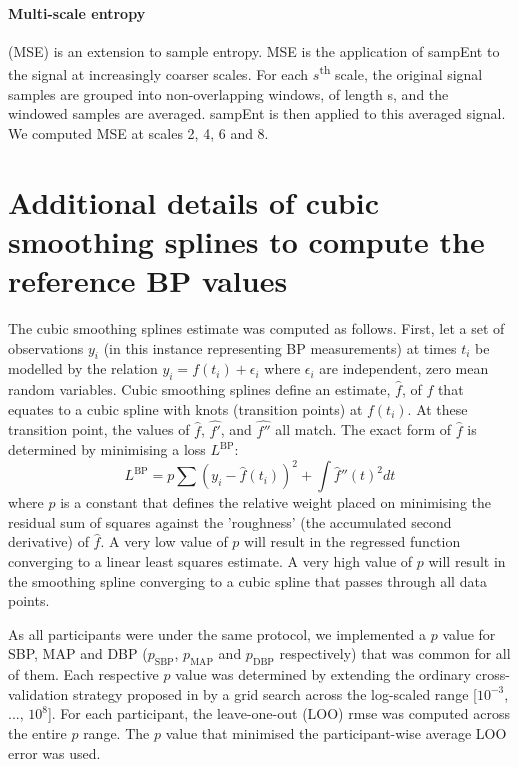 \documentclass[fleqn,10pt]{wlscirep}
\begin{document}
\paragraph{Multi-scale entropy} (MSE) is an extension to sample entropy. MSE is the application of sampEnt to the signal at increasingly coarser scales. For each $s$\textsuperscript{th} scale, the original signal samples are grouped into non-overlapping windows, of length s, and the windowed samples are averaged. sampEnt is then applied to this averaged signal. We computed MSE at scales 2, 4, 6 and 8.


\section{Additional details of cubic smoothing splines to compute the reference BP values}
\label{sec:splines_added_info}

The cubic smoothing splines estimate was computed as follows. First, let a set of observations $y_i$ (in this instance representing BP measurements) at times $t_i$ be modelled by the relation $y_i = f(t_i) + \epsilon_i$ where $\epsilon_i$ are independent, zero mean random variables. Cubic smoothing splines define an estimate, $\hat{f}$, of $f$ that equates to a cubic spline with knots (transition points) at $f(t_i)$. At these transition point, the values of $\hat{f}$, $\hat{f'}$, and $\hat{f''}$ all match. The exact form of $\hat{f}$ is determined by minimising a loss $L^{\text{BP}}$:
\begin{equation}
L^{\text{BP}} = p \sum (y_i - \hat{f}(t_i))^2 + \int \hat{f}''(t)^2 dt
\label{eqn:splines}
\end{equation}
where $p$ is a constant that defines the relative weight placed on minimising the residual sum of squares against the 'roughness' (the accumulated second derivative) of $\hat{f}$. A very low value of $p$ will result in the regressed function converging to a linear least squares estimate. A very high value of $p$ will result in the smoothing spline converging to a cubic spline that passes through all data points. 

As all participants were under the same protocol, we implemented a $p$ value for SBP, MAP and DBP ($p_{\text{SBP}}$, $p_{\text{MAP}}$ and $p_{\text{DBP}}$ respectively) that was common for all of them. Each respective $p$ value was determined by extending the ordinary cross-validation strategy proposed in \cite{Craven1978} by a grid search across the log-scaled range [$10^{-3}$, ..., $10^{8}$]. For each participant, the leave-one-out (LOO) \ac{rmse} was computed across the entire $p$ range. The $p$ value that minimised the participant-wise average LOO error was used.
\end{document}
